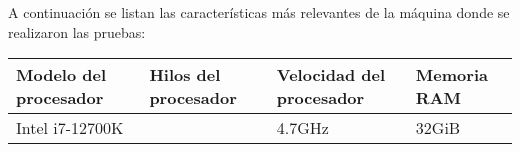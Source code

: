A continuación se listan las características más relevantes de la máquina donde se realizaron las pruebas:

\begin{center}
\begin{tabularx}{\textwidth} { 
    | >{\centering\arraybackslash}X 
    | >{\centering\arraybackslash}X 
    | >{\centering\arraybackslash}X 
    | >{\centering\arraybackslash}X | }
    \hline
    \textbf{Modelo del procesador} & \textbf{Hilos del procesador} & \textbf{Velocidad del procesador} & \textbf{Memoria RAM} \\
    \hline
    Intel i7-12700K & 20 & 4.7GHz & 32GiB \\
    \hline
\end{tabularx}
\end{center}
